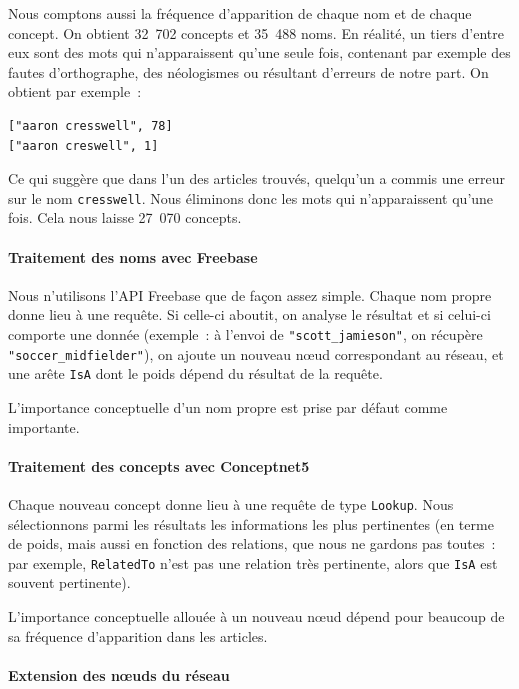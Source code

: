 \documentclass[a4paper, 12pt]{article}
\begin{document}
Nous comptons aussi la fréquence d'apparition de chaque nom et de chaque concept. 
On obtient 32~702 concepts et 35~488 noms. En réalité, un tiers d'entre eux sont des mots qui n'apparaissent qu'une seule fois, contenant par exemple des fautes d'orthographe, des néologismes ou résultant d'erreurs de notre part. On obtient par exemple~:
\begin{verbatim}
["aaron cresswell", 78]
["aaron creswell", 1]
\end{verbatim}
Ce qui suggère que dans l'un des articles trouvés, quelqu'un a commis une erreur sur le nom \verb|cresswell|. Nous éliminons donc les mots qui n'apparaissent qu'une fois. Cela nous laisse 27~070 concepts.

\paragraph{Traitement des noms avec Freebase}

Nous n'utilisons l'API Freebase que de fa\c{c}on assez simple. Chaque nom propre donne lieu à une requête. Si celle-ci aboutit, on analyse le résultat et si celui-ci comporte une donnée (exemple~: à l'envoi de \verb|"scott_jamieson"|, on récupère \verb|"soccer_midfielder"|), on ajoute un nouveau n\oe{}ud correspondant au réseau, et une arête \verb|IsA| dont le poids dépend du résultat de la requête.

L'importance conceptuelle d'un nom propre est prise par défaut comme importante.

\paragraph{Traitement des concepts avec Conceptnet5}

Chaque nouveau concept donne lieu à une requête de type \verb|Lookup|. Nous sélectionnons parmi les résultats les informations les plus pertinentes (en terme de poids, mais aussi en fonction des relations, que nous ne gardons pas toutes~: par exemple, \verb|RelatedTo| n'est pas une relation très pertinente, alors que \verb|IsA| est souvent pertinente).

L'importance conceptuelle allouée à un nouveau n\oe{}ud dépend pour beaucoup de sa fréquence d'apparition dans les articles.


\paragraph{Extension des nœuds du réseau}
\end{document}
